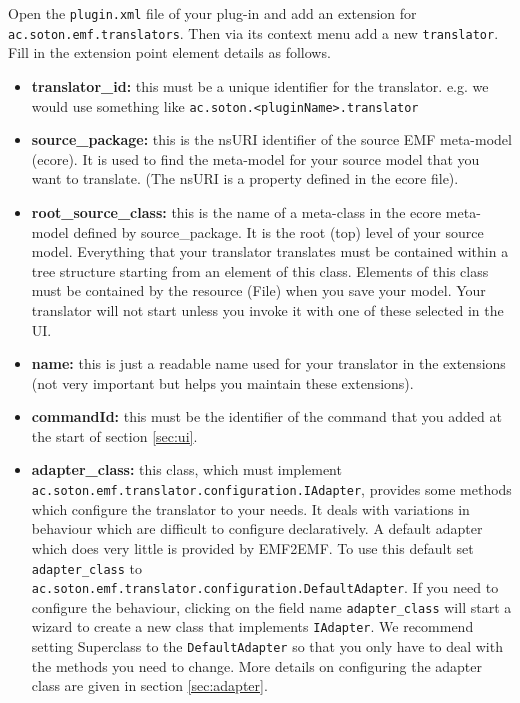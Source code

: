 	Open the \texttt{plugin.xml} file of your plug-in and add an extension for \texttt{ac.soton.emf.translators}. Then via its context menu add a new \texttt{translator}. Fill in the extension point element details as follows.
	\begin{itemize}
		\item \textbf{translator\_id:} this must be a unique identifier for the translator. e.g. we would use something like \texttt{ac.soton.<pluginName>.translator}
		\item \textbf{source\_package:} this is the nsURI identifier of the source EMF meta-model (ecore). It is used to find the meta-model for your source model that you want to translate. (The nsURI is a property defined in the ecore file).
		\item \textbf{root\_source\_class:} this is the name of a meta-class in the ecore meta-model defined by source\_package. It is the root (top) level of your source model. Everything that your translator translates must be contained within a tree structure starting from an element of this class. Elements of this class must be contained by the resource (File) when you save your model. Your translator will not start unless you invoke it with one of these selected in the UI.
		\item \textbf{name:} this is just a readable name used for your translator in the extensions (not very important but helps you maintain these extensions).
		\item \textbf{commandId:} this must be the identifier of the command that you added at the start of section \ref{sec:ui}.
		\item \textbf{adapter\_class:} this class, which must implement\\ \texttt{ac.soton.emf.translator.configuration.IAdapter}, provides some methods which configure the translator to your needs. It deals with variations in behaviour which are difficult to configure declaratively. A default adapter which does very little is provided by EMF2EMF. To use this default set \texttt{adapter\_class} to\\ \texttt{ac.soton.emf.translator.configuration.DefaultAdapter}. If you need to configure the behaviour, clicking on the field name \texttt{adapter\_class} will start a wizard to create a new class that implements \texttt{IAdapter}. We recommend setting Superclass to the \texttt{DefaultAdapter} so that you only have to deal with the methods you need to change. More details on configuring the adapter class are given in section \ref{sec:adapter}. 
	\end{itemize}

